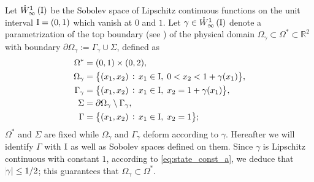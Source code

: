 \documentclass[final]{siamltex}
\begin{document}
Let ${{\mathring{W}^{{1}}_{{\infty}}\del{{\text{\rm I}}}}}$ be the Sobolev space of Lipschitz
continuous functions on the unit interval ${\text{\rm I}}=(0,1)$ which vanish at $0$ and $1$. 
Let $\gamma \in {{\mathring{W}^{{1}}_{{\infty}}\del{{\text{\rm I}}}}}$ denote a parametrization of the top boundary (see ) of 
the physical domain 
$\Omega_{\gamma} \subset \Omega^* \subset \mathbb{R}^2$ with boundary 
$\partial \Omega_{\gamma} := \Gamma_{\gamma} \cup \Sigma$, defined as 
\begin{subequations}
	\begin{align*}
 		\Omega^* &= (0,1) \times (0,2), \\
 		{{\Omega_\gamma}} &= {\cbr{{(x_1,x_2)}\,:\, {x_1 \in {\text{\rm I}}, \;0< x_2 < 1+ \gamma(x_1)}}}, \\
 		\Gamma_{\gamma} &= {\cbr{{(x_1,x_2)}\,:\, {x_1\in{\text{\rm I}},\; x_2=1+\gamma(x_1)}}}, \\ 
 		\Sigma &= {\partial}\Omega_{\gamma} \setminus \Gamma_{\gamma}, \\
		 \Gamma &= {\cbr{{(x_1,x_2)}\,:\, { x_1 \in {\text{\rm I}},\; x_2=1}}} ;
	\end{align*}
\end{subequations}
$\Omega^*$ and $\Sigma$ are fixed while $\Omega_{\gamma}$ and $\Gamma_{\gamma}$ deform
according to $\gamma$. 
Hereafter we will identify $\Gamma$ with
 ${\text{\rm I}}$ as well as Sobolev spaces defined on them. Since $\gamma$ is Lipschitz continuous with constant $1$, according to 
\eqref{eq:state_const_a}, we deduce that $\abs{\gamma} \leq 1/2$; this guarantees that $\Omega_\gamma \subset \Omega^*$. 
\end{document}
